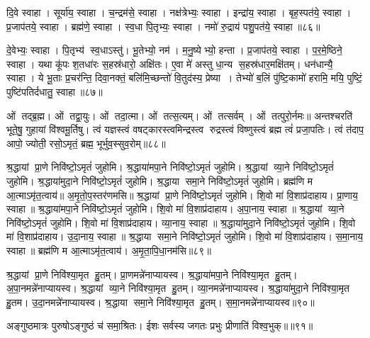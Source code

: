 दि॒वे स्वाहा। 
सूर्या॑य॒ स्वाहा। 
च॒न्द्रम॑से॒ स्वाहा। 
नक्ष॑त्रेभ्यः॒ स्वाहा। 
इन्द्रा॑य॒ स्वाहा। 
बृह॒स्पत॑ये॒ स्वाहा। 
प्र॒जाप॑तये॒ स्वाहा। 
ब्रह्म॑णे॒ स्वाहा। 
स्व॒धा पि॒तृभ्यः॒ स्वाहा। 
नमो॑ रु॒द्राय॑ पशु॒पत॑ये॒ स्वाहा॥८६॥

दे॒वेभ्यः॒ स्वाहा। 
पि॒तृभ्य॑ स्व॒धाऽस्तु॑। 
भू॒तेभ्यो॒ नम॑। 
म॒नु॒ष्येभ्यो॒ हन्ता। 
प्र॒जाप॑तये॒ स्वाहा। 
प॒र॒मे॒ष्ठिने॒ स्वाहा। 
यथा कू॑पः श॒तधा॑रः स॒हस्र॑धारो॒ अक्षि॑तः। 
ए॒वा मे॑ अस्तु धा॒न्य स॒हस्र॑धार॒मक्षि॑तम्। 
धन॑धान्यै॒ स्वाहा। 
ये भू॒ताः प्र॒चर॑न्ति॒ दिवा॒नक्तं॒ बलि॑मि॒च्छन्तो॑ वि॒तुद॑स्य॒ प्रेष्या। 
तेभ्यो॑ ब॒लिं पु॑ष्टि॒कामो॑ हरामि॒ मयि॒ पुष्टिं॒ पुष्टि॑पतिर्दधातु॒ स्वाहा॥८७॥ 
\anuvakamend

ओं तद्ब्र॒ह्म। 
ओं तद्वा॒युः। 
ओं तदा॒त्मा। 
ओं तत्स॒त्यम्‌।
ओं तत्सर्वम्‌। 
ओं तत्पुरो॒र्नमः॥
अन्तश्चरति॑ भूते॒षु॒ गुहायां वि॑श्वमू॒र्तिषु। 
त्वं यज्ञस्त्वं वषट्कारस्त्वमिन्द्रस्त्व रुद्रस्त्वं विष्णुस्त्वं ब्रह्म त्वं॑ प्रजा॒पतिः।
त्वं त॑दाप॒ आपो॒ ज्योती॒ रसो॒ऽमृतं॒ ब्रह्म॒ भूर्भुव॒स्सुव॒रोम्‌॥८८॥
\anuvakamend

श्र॒द्धायां प्रा॒णे निवि॑ष्टो॒ऽमृतं॑ जुहोमि। 
श्र॒द्धाया॑मपा॒ने निवि॑ष्टो॒ऽमृतं॑ जुहोमि। 
श्र॒द्धायां व्या॒ने निवि॑ष्टो॒ऽमृतं॑ जुहोमि। 
श्र॒द्धाया॑मुदा॒ने निवि॑ष्टो॒ऽमृतं॑ जुहोमि। 
श्र॒द्धाया समा॒ने निवि॑ष्टो॒ऽमृतं॑ जुहोमि। 
ब्रह्म॑णि म आ॒त्माऽमृ॑त॒त्वाय॑॥ 
अ॒मृ॒तो॒प॒स्तर॑णमसि॥ 
श्र॒द्धायां प्रा॒णे निवि॑ष्टो॒ऽमृतं॑ जुहोमि। 
शि॒वो मा॑ वि॒शाप्र॑दाहाय। 
प्रा॒णाय॒ स्वाहा॥ 
श्र॒द्धाया॑मपा॒ने निवि॑ष्टो॒ऽमृतं॑ जुहोमि। 
शि॒वो मा॑ वि॒शाप्र॑दाहाय। 
अ॒पा॒नाय॒ स्वाहा॥ 
श्र॒द्धायां व्या॒ने निवि॑ष्टो॒ऽमृतं॑ जुहोमि। 
शि॒वो मा॑ वि॒शाप्र॑दाहाय। 
व्या॒नाय॒ स्वाहा॥ 
श्र॒द्धाया॑मुदा॒ने निवि॑ष्टो॒ऽमृतं॑ जुहोमि। 
शि॒वो मा॑ वि॒शाप्र॑दाहाय। 
उ॒दा॒नाय॒ स्वाहा॥ 
श्र॒द्धाया समा॒ने निवि॑ष्टो॒ऽमृतं॑ जुहोमि। 
शि॒वो मा॑ वि॒शाप्र॑दाहाय। 
स॒मा॒नाय॒ स्वाहा॥ 
ब्रह्म॑णि म आ॒त्माऽमृ॑त॒त्वाय॑। 
अ॒मृ॒ता॒पि॒धा॒नम॑सि॥८९॥
 \anuvakamend


श्र॒द्धायां प्रा॒णे निवि॑श्या॒मृत हु॒तम्। 
प्रा॒णमन्ने॑नाप्यायस्व। 
श्र॒द्धाया॑मपा॒ने निवि॑श्या॒मृत हु॒तम्। 
अ॒पा॒नमन्ने॑नाप्यायस्व।
श्र॒द्धायां व्या॒ने निवि॑श्या॒मृत हु॒तम्। 
व्या॒नमन्ने॑नाप्यायस्व। 
श्र॒द्धाया॑मुदा॒ने निवि॑श्या॒मृत हु॒तम। 
उ॒दा॒नमन्ने॑नाप्यायस्व।
श्र॒द्धाया समा॒ने निवि॑श्या॒मृत हु॒तम्। 
स॒मा॒नमन्ने॑नाप्या\-यस्व॥९०॥\anuvakamend

अङ्गुष्ठमात्रः पुरुषोऽङ्गुष्ठं च॑ समा॒श्रितः। 
ईशः सर्वस्य जगतः प्रभुः प्रीणाति॑ विश्व॒भुक्॥॥९१॥\anuvakamend


